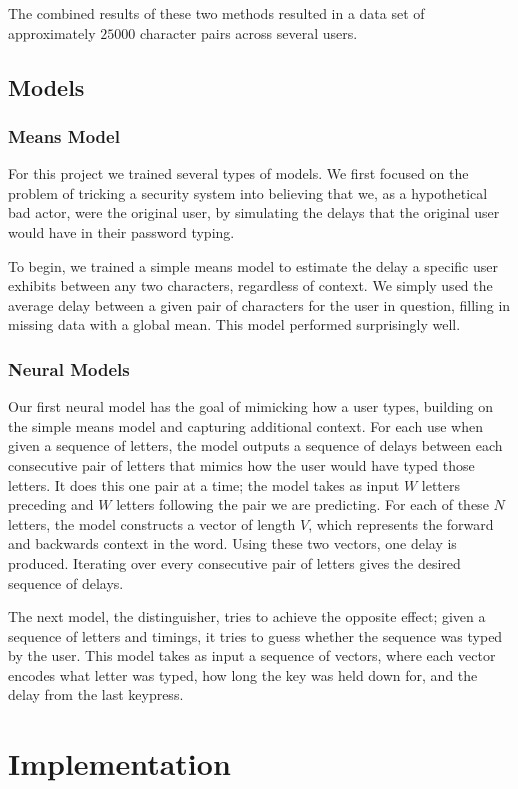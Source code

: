 \documentclass{amsart}
\begin{document}
\begin{multicols*}{2}
The combined results of these two methods resulted in a data set of approximately $25000$ character pairs across several users.

\subsection{Models}
\subsubsection{Means Model}
For this project we trained several types of models. We first focused on the problem of tricking a security system into believing that we, as a hypothetical bad actor, were the original user, by simulating the delays that the original user would have in their password typing.

To begin, we trained a simple means model to estimate the delay a specific user exhibits between any two characters, regardless of context. We simply used the average delay between a given pair of characters for the user in question, filling in missing data with a global mean. This model performed surprisingly well.

\subsubsection{Neural Models}
Our first neural model has the goal of mimicking how a user types, building on the simple means model and capturing additional context. For each use when given a sequence of letters, the model outputs a sequence of delays between each consecutive pair of letters that mimics how the user would have typed those letters. It does this one pair at a time; the model takes as input $W$ letters preceding and $W$ letters following the pair we are predicting. For each of these $N$ letters, the model constructs a vector of length $V$, which represents the forward and backwards context in the word. Using these two vectors, one delay is produced. Iterating over every consecutive pair of letters gives the desired sequence of delays.

The next model, the distinguisher, tries to achieve the opposite effect; given a sequence of letters and timings, it tries to guess whether the sequence was typed by the user. This model takes as input a sequence of vectors, where each vector encodes what letter was typed, how long the key was held down for, and the delay from the last keypress.

\section{Implementation}


\end{multicols*}
\end{document}
